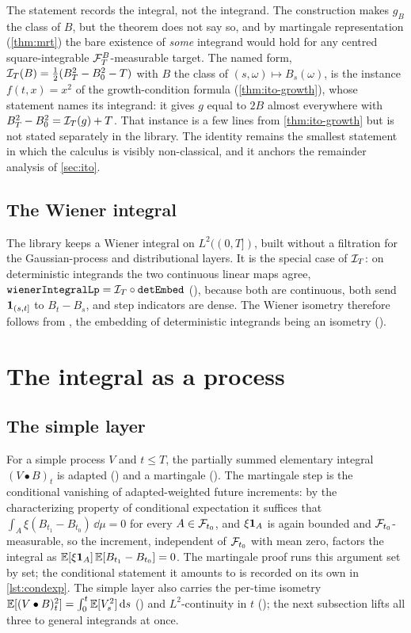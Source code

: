 \documentclass[11pt]{article}
\newcommand{\bulletB}{\mathbin{\bullet}}
\begin{document}
The statement records the integral, not the integrand. The construction makes $g_B$ the class of $B$, but
the theorem does not say so, and by martingale representation (\cref{thm:mrt}) the bare existence of
\emph{some} integrand would hold for any centred square-integrable $\mathcal{F}^B_T$-measurable target. The named
form, $\mathcal{I}_T(B)=\frac12(B_T^2-B_0^2-T)$ with $B$ the class of $(s,\omega)\mapsto B_s(\omega)$, is the instance
$f(t,x)=x^2$ of the growth-condition formula (\cref{thm:ito-growth}), whose statement names its integrand:
it gives $g$ equal to $2B$ almost everywhere with $B_T^2-B_0^2=\mathcal{I}_T(g)+T$. That instance is a few lines
from \cref{thm:ito-growth} but is not stated separately in the library. The identity remains the smallest
statement in which the calculus is visibly non-classical, and it anchors the remainder analysis of
\cref{sec:ito}.

\subsection{The Wiener integral}
The library keeps a Wiener integral on $L^2((0,T])$, built without a filtration for the Gaussian-process and
distributional layers. It is the special case of $\mathcal{I}_T$: on deterministic integrands the two continuous linear
maps agree, $\texttt{wienerIntegralLp}=\mathcal{I}_T\circ\texttt{detEmbed}$ (),
because both are continuous, both send $\mathbf{1}_{(s,t]}$ to $B_t-B_s$, and step indicators are dense. The Wiener
isometry therefore follows from , the embedding of deterministic integrands being an
isometry ().

\section{The integral as a process}\label{sec:process}

\subsection{The simple layer}
For a simple process $V$ and $t\le T$, the partially summed elementary integral $(V\bulletB B)_t$ is
adapted () and a martingale (). The
martingale step is the conditional vanishing of adapted-weighted future increments: by the characterizing
property of conditional expectation it suffices that $\int_A\xi(B_{t_1}-B_{t_0})\,\dd\mu=0$ for every
$A\in\mathcal{F}_{t_0}$, and $\xi\mathbf{1}_A$ is again bounded and $\mathcal{F}_{t_0}$-measurable, so the increment, independent of
$\mathcal{F}_{t_0}$ with mean zero, factors the integral as $\mathbb{E}[\xi\mathbf{1}_A]\,\mathbb{E}[B_{t_1}-B_{t_0}]=0$. The martingale proof
runs this argument set by set; the conditional statement it amounts to is recorded on its own in
\cref{lst:condexp}. The simple layer also carries the per-time isometry
$\E[(V\bulletB B)_t^2]=\int_0^t\E[V_s^2]\,\dd s$ () and
$L^2$-continuity in $t$ (); the next subsection lifts all three to
general integrands at once.
\end{document}
